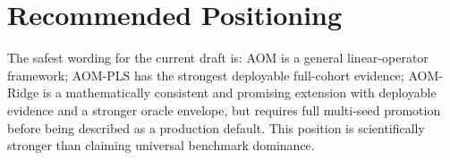 \documentclass[11pt,a4paper]{article}
\begin{document}
\section{Recommended Positioning}

The safest wording for the current draft is: AOM is a general linear-operator
framework; AOM-PLS has the strongest deployable full-cohort evidence; AOM-Ridge
is a mathematically consistent and promising extension with deployable evidence
and a stronger oracle envelope, but requires full multi-seed promotion before
being described as a production default.  This position is scientifically
stronger than claiming universal benchmark dominance.

\nocite{geladi1986partial,wold2001pls,dejong1993simpls,hoerl1970ridge,rinnan2009review,savitzky1964smoothing,barnes1989standard,geladi1985linearization}



\end{document}
